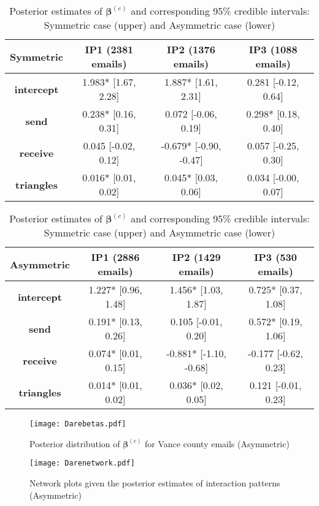 \documentclass[a4paper]{article}
\begin{document}
		\begin{table}[ht]
			\centering
			\begin{tabular}{|c|c|c|c|} 
				\hline
				\textbf{Symmetric}&	{\textbf{IP1} (2381 emails)}&{\textbf{IP2} (1376 emails)}&{\textbf{IP3} (1088 emails)}\\
				\hline
				\textbf{intercept} & 1.983* [1.67, 2.28]& 1.887* [1.61, 2.31]& 0.281 [-0.12, 0.64]\\
				\textbf{send}&  0.238* [0.16, 0.31]& 0.072 [-0.06, 0.19]& 0.298* [0.18, 0.40]\\
				\textbf{receive}& 0.045 [-0.02, 0.12]& -0.679* [-0.90, -0.47]& 0.057 [-0.25, 0.30]\\
				\textbf{triangles} & 0.016* [0.01, 0.02]&  0.045* [0.03, 0.06]& 0.034 [-0.00, 0.07]\\
				\hline
			\end{tabular}
			\begin{tabular}{|c|c|c|c|} 
				\hline
				\textbf{Asymmetric}& 	{\textbf{IP1} (2886 emails)}&{\textbf{IP2} (1429 emails)}&{\textbf{IP3} (530 emails)}\\
				\hline
				\textbf{intercept} &1.227* [0.96, 1.48]& 1.456* [1.03, 1.87]& 0.725* [0.37, 1.08]\\
				\textbf{send}&  0.191* [0.13, 0.26]& 0.105 [-0.01, 0.20]& 0.572* [0.19, 1.06]\\
				\textbf{receive}& 0.074* [0.01, 0.15]& -0.881* [-1.10, -0.68]& -0.177 [-0.62, 0.23]\\
				\textbf{triangles} & 0.014* [0.01, 0.02]&  0.036* [0.02, 0.05]& 0.121 [-0.01, 0.23]\\
				\hline
			\end{tabular}
			\caption {Posterior estimates of $\boldsymbol{\beta}^{(c)}$ and corresponding 95\% credible intervals: Symmetric case (upper) and Asymmetric case (lower)}
			\label{table:Vancebeta}
		\end{table}
		\normalsize 	
		\begin{figure}[ht]
			\centering
			\texttt{[image: Darebetas.pdf]} 
			\caption{Posterior distribution of  $\boldsymbol{\beta}^{(c)}$ for Vance county emails (Asymmetric)}
			\label{fig:Vanceboxplot}
		\end{figure}
		\begin{figure}[ht]
			\centering
			\texttt{[image: Darenetwork.pdf]} 
			\caption{Network plots given the posterior estimates of interaction patterns (Asymmetric)}
			\label{fig:Vanceboxplot}
		\end{figure}
\end{document}
